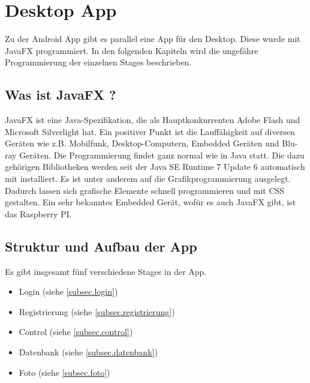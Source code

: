 
\chapter{Desktop App}
Zu der Android App gibt es parallel eine App für den Desktop. Diese wurde mit JavaFX  programmiert. In den folgenden Kapiteln wird die ungefähre Programmierung der einzelnen Stages beschrieben.

				
				
\section{Was ist JavaFX ?}
JavaFX ist eine Java-Spezifikation, die als Hauptkonkurrenten Adobe Flash und Microsoft Silverlight hat. Ein positiver Punkt ist die Lauffähigkeit auf diversen Geräten wie z.B. Mobilfunk, Desktop-Computern, Embedded Geräten und Blu-ray Geräten. Die Programmierung findet ganz normal wie in Java statt. Die dazu gehörigen Bibliotheken werden seit der Java SE Runtime 7 Update 6 automatisch mit installiert. Es ist unter anderem auf die Grafikprogrammierung ausgelegt. Dadurch lassen sich grafische Elemente schnell programmieren und mit CSS gestalten.
Ein sehr bekanntes Embedded Gerät, wofür es auch JavaFX gibt, ist das Raspberry PI. \cite{bib.jFXRaspPi}

\section{Struktur und Aufbau der App}
Es gibt insgesamt fünf verschiedene Stages in der App.
\begin{itemize}
	\item Login (siehe \ref{subsec.login})
	\item Registrierung (siehe \ref{subsec.registrierung})
	\item Control (siehe \ref{subsec.control})
	\item Datenbank (siehe \ref{subsec.datenbank})
	\item Foto (siehe \ref{subsec.foto})
\end{itemize}

